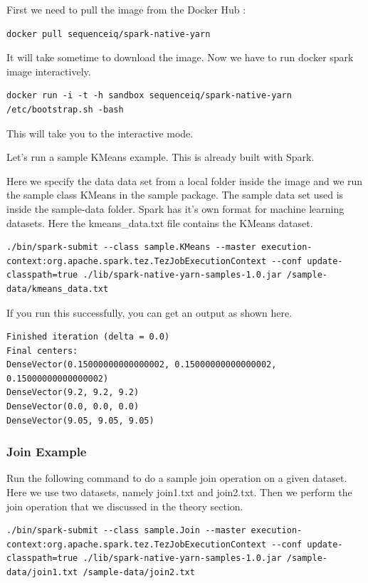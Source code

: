 First we need to pull the image from the Docker Hub :

\begin{lstlisting}
docker pull sequenceiq/spark-native-yarn
\end{lstlisting}

It will take sometime to download the image. Now we have to run docker
spark image interactively.

\begin{lstlisting}
docker run -i -t -h sandbox sequenceiq/spark-native-yarn /etc/bootstrap.sh -bash
\end{lstlisting}

This will take you to the interactive mode.

Let's run a sample KMeans example. This is already built with Spark.

Here we specify the data data set from a local folder inside the image
and we run the sample class KMeans in the sample package. The sample
data set used is inside the sample-data folder. Spark has it's own
format for machine learning datasets. Here the kmeans\_data.txt file
contains the KMeans dataset.

\begin{lstlisting}
./bin/spark-submit --class sample.KMeans --master execution-context:org.apache.spark.tez.TezJobExecutionContext --conf update-classpath=true ./lib/spark-native-yarn-samples-1.0.jar /sample-data/kmeans_data.txt
\end{lstlisting}

If you run this successfully, you can get an output as shown here.

\begin{lstlisting}
Finished iteration (delta = 0.0)
Final centers:
DenseVector(0.15000000000000002, 0.15000000000000002, 0.15000000000000002)
DenseVector(9.2, 9.2, 9.2)
DenseVector(0.0, 0.0, 0.0)
DenseVector(9.05, 9.05, 9.05)
\end{lstlisting}

\subsubsection{Join Example}

Run the following command to do a sample join operation on a given
dataset. Here we use two datasets, namely join1.txt and join2.txt. Then
we perform the join operation that we discussed in the theory section.

\begin{lstlisting}
./bin/spark-submit --class sample.Join --master execution-context:org.apache.spark.tez.TezJobExecutionContext --conf update-classpath=true ./lib/spark-native-yarn-samples-1.0.jar /sample-data/join1.txt /sample-data/join2.txt
\end{lstlisting}

